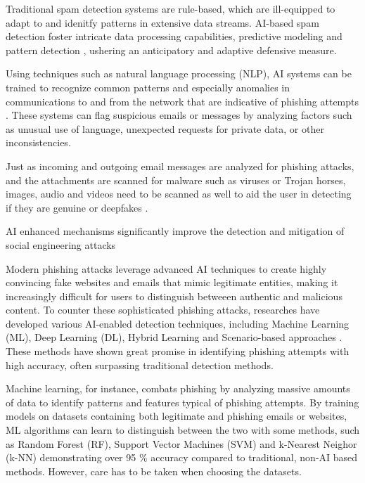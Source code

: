 Traditional spam detection systems are rule-based, which are ill-equipped to adapt to and idenitfy patterns in extensive data streams. AI-based spam detection foster intricate data processing capabilities, predictive modeling and pattern detection \citep{fakhouriAIDrivenSolutionsForSocialEngineeringAttacks2024}, ushering an anticipatory and adaptive defensive measure.

Using techniques such as natural language processing (NLP), AI systems can be trained to recognize common patterns and especially anomalies in communications to and from the network that are indicative of phishing attempts \citep{basitComprehensiveSurveyAIenabledPhishingAttacks2021}. These systems can flag suspicious emails or messages by analyzing factors such as unusual use of language, unexpected requests for private data, or other inconsistencies.

Just as incoming and outgoing email messages are analyzed for phishing attacks, and the attachments are scanned for malware such as viruses or Trojan horses, images, audio and videos need to be scanned as well to aid the user in detecting if they are genuine or deepfakes \citep{mirskyTheCreationAndDetectionOfDeepfakes2021}.

AI enhanced mechanisms significantly improve the detection and mitigation of social engineering attacks \citep{fakhouriAIDrivenSolutionsForSocialEngineeringAttacks2024}

Modern phishing attacks leverage advanced AI techniques to create highly convincing fake websites and emails that mimic legitimate entities, making it increasingly difficult for users to distinguish betweeen authentic and malicious content. To counter these sophisticated phishing attacks, researches have developed various AI-enabled detection techniques, including Machine Learning (ML), Deep Learning (DL), Hybrid Learning and Scenario-based approaches \citep{basitComprehensiveSurveyAIenabledPhishingAttacks2021}. These methods have shown great promise in identifying phishing attempts with high accuracy, often surpassing traditional detection methods.


Machine learning, for instance, combats phishing by analyzing massive amounts of data to identify patterns and features typical of phishing attempts. By training models on datasets containing both legitimate and phishing emails or websites, ML algorithms can learn to distinguish between the two with some methods, such as Random Forest (RF), Support Vector Machines (SVM) and k-Nearest Neighor (k-NN) demonstrating over 95 \% accuracy compared to traditional, non-AI based methods. However, care has to be taken when choosing the datasets.

